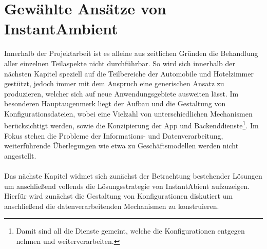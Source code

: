 \section{Gewählte Ansätze von InstantAmbient}
Innerhalb der Projektarbeit ist es alleine aus zeitlichen Gründen die Behandlung aller einzelnen Teilaspekte nicht durchführbar. So wird sich innerhalb der nächsten Kapitel 
speziell auf die Teilbereiche der Automobile und Hotelzimmer gestützt, jedoch immer mit dem Anspruch eine generischen Ansatz zu produzieren, welcher sich auf neue 
Anwendungsgebiete ausweiten lässt. Im besonderen Hauptaugenmerk liegt der Aufbau und die Gestaltung von Konfigurationsdateien, wobei eine Vielzahl von unterschiedlichen 
Mechanismen berücksichtigt werden, sowie die Konzipierung der App und Backenddienste\footnote{Damit sind all die Dienste gemeint, welche die Konfigurationen entgegen nehmen 
und weiterverarbeiten.}. Im Fokus stehen die Probleme der Informations- und Datenverarbeitung, weiterführende Überlegungen wie etwa zu Geschäftsmodellen werden nicht 
angestellt. 
\\\\
Das nächste Kapitel widmet sich zunächst der Betrachtung bestehender Lösungen um anschließend vollends die Lösungsstrategie von InstantAbient aufzuzeigen. Hierfür wird 
zunächst die Gestaltung von Konfigurationen diskutiert um anschließend die datenverarbeitenden Mechanismen zu konstruieren. 

